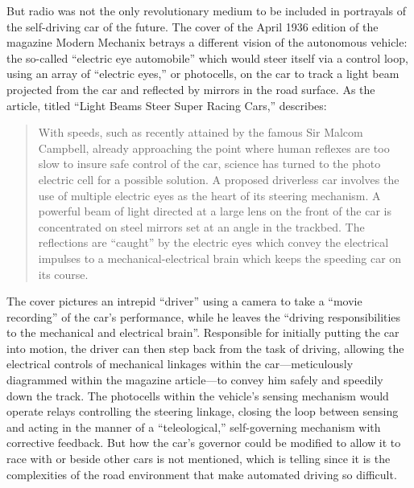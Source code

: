 But radio was not the only revolutionary medium to be included in
 portrayals of the self-driving car of the future. The cover of the
 April 1936\cite{???} edition of the magazine Modern Mechanix betrays a
 different vision of the autonomous vehicle: the so-called ``electric
 eye automobile'' which would steer itself via a control loop, using an
 array of ``electric eyes,'' or photocells, on the car to track a light
 beam projected from the car and reflected by mirrors in the road
 surface. As the article, titled ``Light Beams Steer Super Racing
 Cars,'' describes:
\begin{quote}
With speeds, such as recently attained by the famous Sir Malcom
Campbell, already approaching the point where human reflexes are too
slow to insure safe control of the car, science has turned to the
photo electric cell for a possible solution. A proposed driverless car
involves the use of multiple electric eyes as the heart of its
steering mechanism. A powerful beam of light directed at a large lens
on the front of the car is concentrated on steel mirrors set at an
angle in the trackbed. The reflections are “caught” by the electric
eyes which convey the electrical impulses to a mechanical-electrical
brain which keeps the speeding car on its course.\cite{???}
\end{quote}

The cover pictures an intrepid ``driver'' using a camera to take a
``movie recording'' of the car's performance, while he leaves the
``driving responsibilities to the mechanical and electrical brain''\cite{???}.
Responsible for initially putting the car into motion, the driver can
then step back from the task of driving, allowing the electrical
controls of mechanical linkages within the car---meticulously diagrammed
within the magazine article---to convey him safely and speedily down
the track. The photocells within the vehicle's sensing mechanism would
operate relays controlling the steering linkage, closing the loop
between sensing and acting in the manner of a ``teleological,''
self-governing mechanism with corrective feedback.\cite{???} But how
the car's governor could be modified to allow it to race with or
beside other cars is not mentioned, which is telling since it is the
complexities of the road environment that make automated driving so difficult.

